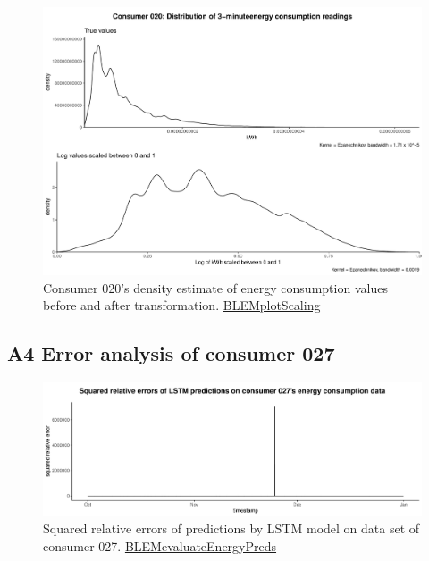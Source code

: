 \begin{centering}
\begin{figure}[!htbp]
        \includegraphics[width=\textwidth-0.85cm]{thesis/graphs/c020_density.pdf}
        \caption[Energy consumption distribution before and after transformation]{Consumer 020's density estimate of energy consumption values before and after transformation. \quantnet\href{https://github.com/QuantLet/BLEM/tree/master/BLEMplotScaling}{BLEMplotScaling}}
\end{figure}
\end{centering}


\subsection*{\hypertarget{AppA4:Figures:erroranalysis}{A4} Error analysis of consumer 027}\label{AppA4:Figures:erroranalysis}

\begin{centering}
\begin{figure}[H]
    \includegraphics[width=\textwidth]{thesis/graphs/evaluation/c027_squarederrors.pdf}
    \caption[Squared relative errors of predictions by LSTM model on consumer 027]{Squared relative errors of predictions by LSTM model on data set of consumer 027. \quantnet\href{https://github.com/QuantLet/BLEM/tree/master/BLEMevaluateEnergyPreds}{BLEMevaluateEnergyPreds}}
\end{figure}
\end{centering}



